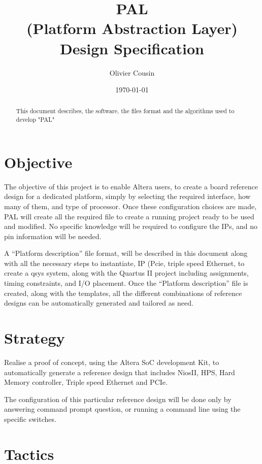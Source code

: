 \documentclass[a4paper]{article}
\title{ PAL \\ (Platform Abstraction Layer)\\ Design Specification}
\author{Olivier Cousin}
\date{\today}
\begin{document}
\maketitle

\begin{abstract}
This document describes, the software, the files format and the algorithms used to develop "PAL"
\end{abstract}

\section{Objective}

The objective of this project is to enable Altera users, to create a board reference design for a dedicated platform, simply by selecting the required interface, how many of them, and type of processor. Once these configuration choices are made, PAL will create all the required file to create a running project ready to be used and modified.  
No specific knowledge will be required to configure the IPs, and no pin information will be needed. 

A “Platform description” file format, will be described in this document along with all the necessary steps to instantiate, IP (Pcie, triple speed Ethernet, to create a qsys system, along with the Quartus II project including assignments, timing constraints, and I/O placement.
Once the “Platform description” file is created, along with the templates, all the different combinations of reference designs can be automatically generated and tailored as need.


\section{Strategy}
Realise a proof of concept, using the Altera SoC development Kit, to automatically generate a reference design that includes NiosII, HPS, Hard Memory controller, Triple speed Ethernet and PCIe.

The configuration of this particular reference design will be done only by answering command prompt question, or running a command line using the specific switches.

\section{Tactics}
\end{document}
